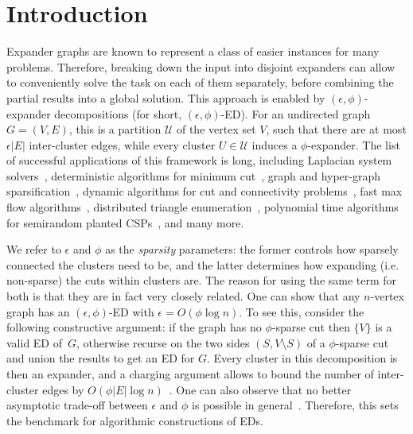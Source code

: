 \documentclass[epsfig,letter,11pt]{article}
\numberwithin{equation}{section}
\begin{document}
\pagestyle{empty}
\newpage
\tableofcontents
\setcounter{page}{0}
\newpage

\pagestyle{plain}

\section{Introduction}
Expander graphs are known to represent a class of easier instances for many problems. Therefore, breaking down the input into disjoint expanders can allow to conveniently solve the task on each of them separately, before combining the partial results into a global solution. This approach is enabled by $(\epsilon, \phi)$-expander decompositions (for short, $(\epsilon, \phi)$-ED). For an undirected graph $G=(V,E)$, this is a partition $\mathcal{U}$ of the vertex set $V$, such that there are at most $\epsilon |E|$ inter-cluster edges, while every cluster $U \in \mathcal{U}$ induces a $\phi$-expander. The list of successful applications of this framework is long, including Laplacian system solvers~\cite{stlapl}, deterministic algorithms for minimum cut~\cite{mincutjli}, graph and hyper-graph sparsification~\cite{stspectral, chugao, hgsparse,svapprox}, dynamic algorithms for cut and connectivity problems~\cite{boundlink,sublinearconn}, fast max flow algorithms~\cite{maxflow}, distributed triangle enumeration~\cite{triang}, polynomial time algorithms for semirandom planted CSPs~\cite{csps}, and many more.

We refer to $\epsilon$ and $\phi$ as the \emph{sparsity} parameters: the former controls how sparsely connected the clusters need to be, and the latter determines how expanding (i.e. non-sparse) the cuts within clusters are. The reason for using the same term for both is that they are in fact very closely related. One can show that any $n$-vertex graph has an $(\epsilon,\phi)$-ED with $\epsilon = O(\phi \log n)$. To see this, consider the following constructive argument: if the graph has no $\phi$-sparse cut then $\{V\}$ is a valid ED of~$G$, otherwise recurse on the two sides $(S,V \setminus S)$ of a $\phi$-sparse cut and union the results to get an ED for $G$. Every cluster in this decomposition is then an expander, and a charging argument allows to bound the number of inter-cluster edges by $O(\phi |E| \log n)$~\cite{offlineexpdec}. One can also observe that no better asymptotic trade-off between $\epsilon$ and $\phi$ is possible in general~\cite{clusteringhypercube}. Therefore, this sets the benchmark for algorithmic constructions of EDs.
\end{document}
